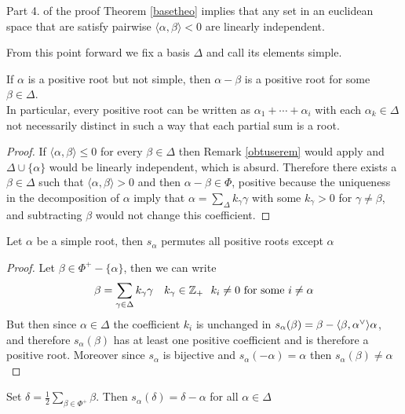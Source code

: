 \begin{remark}
	Part 4. of the proof Theorem \ref{basetheo} implies that any set in an euclidean space that are satisfy pairwise $\langle \alpha,\beta\rangle < 0$ are linearly independent.
	\label{obtuserem}
\end{remark}
From this point forward we fix a basis $\Delta$ and call its elements simple.
\begin{lema}
	If $\alpha$ is a positive root but not simple, then $\alpha-\beta$ is a positive root for some $\beta \in \Delta$.\\
	In particular, every positive root can be written as $\alpha_1+\cdots +\alpha_i$ with each $\alpha_k \in \Delta$ not necessarily distinct in such a way that each partial sum is a root.
	\label{partialsum}
\end{lema}
\begin{proof}
	If $\langle \alpha,\beta\rangle \le 0$ for every $\beta \in \Delta$ then Remark \ref{obtuserem}  would apply and $\Delta \cup \{\alpha\}$ would be linearly independent, which is absurd. Therefore there exists a $\beta \in \Delta$ such that $\langle \alpha,\beta \rangle > 0$ and then $\alpha-\beta \in \Phi$, positive because the uniqueness in the decomposition of $\alpha$ imply that $\alpha = \sum_\Delta k_\gamma \gamma$ with some $k_\gamma > 0$ for $\gamma \not=\beta$, and subtracting $\beta$ would not change this coefficient.
\end{proof}
\begin{lema}
	Let $\alpha$ be a simple root, then $s_\alpha$ permutes all positive roots except $\alpha$
	\label{permutepositive}
\end{lema}
\begin{proof}
	Let $\beta \in \Phi^+ - \{\alpha\}$, then we can write 
	$$ \beta = \sum_{\gamma \in \Delta} k_\gamma \gamma \ \ \ k_\gamma \in \mathbb{Z}_+ \ \ k_i \not=0 \text{ for some }\\i\not=\alpha$$
	But then since $\alpha \in \Delta$ the coefficient $k_i$ is unchanged in $s_\alpha(\beta) = \beta - \langle {\beta},{\alpha}^\lor\rangle\alpha$, and therefore $s_\alpha(\beta)$ has at least one positive coefficient and is therefore a positive root. Moreover since $s_\alpha$ is bijective and $s_\alpha(-\alpha)=\alpha$ then $s_\alpha(\beta)\not=\alpha$ 
\end{proof}
\begin{corol}
	Set $\delta = \displaystyle \frac{1}{2}\sum_{\beta \in \Phi^+} \beta$. Then $s_\alpha(\delta) = \delta - \alpha$ for all $\alpha \in \Delta$
	\label{corolexistancedelta}
\end{corol}
